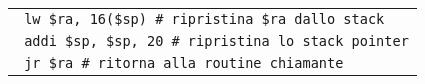 \documentclass[../main.tex]{subfiles}
\begin{document}
\begin{tabular}{ l }
    \texttt{\hspace*{0cm} \hspace*{0cm} \hspace*{0cm} \hspace*{0cm} \hspace*{0cm} \hspace*{0cm} \hspace*{0cm} \hspace*{0cm} \hspace*{0cm} lw \$ra, 16(\$sp) \hspace*{0cm} \hspace*{0cm} \hspace*{0cm} \hspace*{0cm} \hspace*{0cm} \hspace*{0cm} \hspace*{0cm} \# ripristina \$ra dallo stack} \\
    \texttt{\hspace*{0cm} \hspace*{0cm} \hspace*{0cm} \hspace*{0cm} \hspace*{0cm} \hspace*{0cm} \hspace*{0cm} \hspace*{0cm} \hspace*{0cm} addi \$sp, \$sp, 20 \hspace*{0cm} \hspace*{0cm} \hspace*{0cm} \hspace*{0cm} \hspace*{0cm} \# ripristina lo stack pointer} \\
    \hline
    \hline
    \texttt{\hspace*{0cm} \hspace*{0cm} \hspace*{0cm} \hspace*{0cm} \hspace*{0cm} \hspace*{0cm} \hspace*{0cm} \hspace*{0cm} \hspace*{0cm} jr \$ra \hspace*{0cm} \hspace*{0cm} \hspace*{0cm} \hspace*{0cm} \hspace*{0cm} \hspace*{0cm} \hspace*{0cm} \hspace*{0cm} \hspace*{0cm} \hspace*{0cm} \hspace*{0cm} \hspace*{0cm} \hspace*{0cm} \hspace*{0cm} \hspace*{0cm} \hspace*{0cm} \# ritorna alla routine chiamante} \\

\end{tabular}
\end{document}
